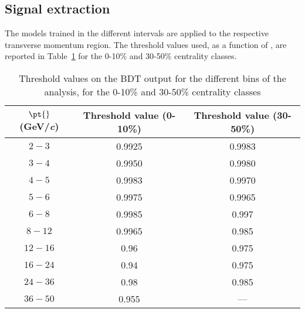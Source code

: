 \subsection{Signal extraction}
The models trained in the different \pt{} intervals are applied to the respective transverse momentum region. The threshold values used, 
as a function of \pt{}, are reported in Table~\ref{tab:cut_values} for the 0-10\% and 30-50\% centrality classes. \\
\begin{table}[h!]
  \begin{center}
  \caption{Threshold values on the BDT output for the different \pt{} bins of the analysis, for the 0-10\% and 
          30-50\% centrality classes}
  \label{tab:cut_values}
  \begin{tabular}{|c|c|c|}
    \hline
    \textbf{$\mathbf{\pt{}}$ (GeV/\textit{c})} & \textbf{Threshold value (0-10\%)} & \textbf{Threshold value (30-50\%)} \\
    \hline
    \(2 - 3\) & 0.9925 & 0.9983 \\
    \hline
    \(3 - 4\) & 0.9950 & 0.9980 \\
    \hline
    \(4 - 5\) & 0.9983 & 0.9970 \\
    \hline
    \(5 - 6\) & 0.9975 & 0.9965 \\
    \hline
    \(6 - 8\) & 0.9985 & 0.997 \\
    \hline
    \(8 - 12\) & 0.9965 & 0.985 \\
    \hline
    \(12 - 16\) & 0.96 & 0.975 \\
    \hline
    \(16 - 24\) & 0.94 & 0.975 \\
    \hline
    \(24 - 36\) & 0.98 & 0.985 \\
    \hline
    \(36 - 50\) & 0.955 & --- \\
    \hline
  \end{tabular}
  \end{center}
\end{table}

